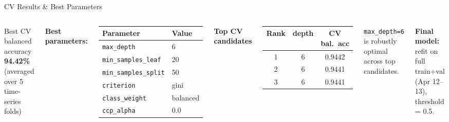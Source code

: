 \documentclass[aspectratio=169,10pt]{beamer}
\newcommand{\code}[1]{\texttt{\small #1}}
\begin{document}
\begin{frame}{CV Results \& Best Parameters}
  \begin{columns}[T]
    \begin{block}{Best CV balanced accuracy}
      \centering\large\textbf{94.42\%}\\
      \small (averaged over 5 time-series folds)
    \end{block}

    \medskip
    \textbf{Best parameters:}
    \begin{center}
    \begin{tabular}{ll}
      \toprule
      Parameter & Value \\
      \midrule
      \code{max\_depth}          & 6 \\
      \code{min\_samples\_leaf}  & 20 \\
      \code{min\_samples\_split} & 50 \\
      \code{criterion}           & gini \\
      \code{class\_weight}       & balanced \\
      \code{ccp\_alpha}          & 0.0 \\
      \bottomrule
    \end{tabular}
    \end{center}

    \textbf{Top CV candidates}
    \begin{center}
    \small
    \begin{tabular}{ccc}
      \toprule
      Rank & depth & CV bal.\ acc \\
      \midrule
      1 & 6 & 0.9442 \\
      2 & 6 & 0.9441 \\
      3 & 6 & 0.9441 \\
      \bottomrule
    \end{tabular}
    \end{center}

    \medskip
    \code{max\_depth=6} is robustly optimal across top candidates.

    \medskip
    \textbf{Final model:} refit on full train+val (Apr 12–13), threshold = 0.5.
  \end{columns}
\end{frame}
\end{document}
